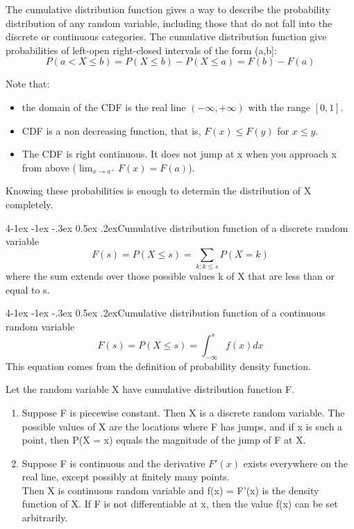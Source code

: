 \documentclass{tufte-handout}
\makeatletter
\renewcommand{\paragraph}{\@startsection{paragraph}%
    {4}{\z@}{-1ex \@plus -1ex \@minus -.3ex}%
    {0.5ex \@plus .2ex}{\normalfont\normalsize\bfseries}}
\makeatother
\begin{document}
    The cumulative distribution function gives a way to describe the probability distribution of any 
    random variable, including those that do not fall into the discrete or continuous categories.
    The cumulative distribution function give probabilities of left-open right-closed intervals of the form (a,b]:
    \[P(a < X \leq b) = P(X \leq b) - P(X \leq a) = F(b) - F(a)\]

    Note that:
    \begin{itemize}
        \item the domain of the CDF is the real line \( (-\infty, +\infty) \) with the range \([0,1]\).
        \item CDF is a non decreasing function, that is, \( F(x) \leq F(y) \) for \( x \leq y \).
        \item The CDF is right continuous. It does not jump at x when you approach x from above (\( \lim_{x \to a^+} F(x) = F(a) \)).

    \end{itemize}
    
    Knowing these probabilities is enough to determin the distribution of X completely.

    \paragraph{Cumulative distribution function of a discrete random variable}
    \[F(s) = P(X \leq s) = \sum_{k:k\leq s} P(X=k)\]
    where the sum extends over those possible values k of X that are less than or equal to s.

    \paragraph{Cumulative distribution function of a continuous random variable}
    \[F(s) = P(X \leq s) = \int_{-\infty}^{s }f(x)dx\]
    This equation comes from the definition of probability density function.

    \begin{Theorem}
        Let the random variable X have cumulative distribution function F.\\
        \begin{enumerate}
            \item Suppose F is piecewise constant. Then X is a discrete random variable.
            The possible values of X are the locations where F has jumps, and if x is such a point, then 
            P(X = x) equals the magnitude of the jump of F at X. 
            \item Suppose F is continuous and the derivative $ F'(x) $ exists everywhere on the real line,
            except possibly at finitely many points. \\ Then X is continuous random variable and f(x) = F'(x) is the density function of X.
            If F is not differentiable at x, then the value f(x) can be set arbitrarily.
        \end{enumerate}
    \end{Theorem}
\end{document}
